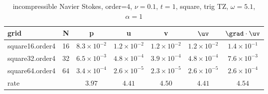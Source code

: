 \begin{table}[hbt]
\begin{center}
\begin{tabular}{|l|c|c|c|c|c|c|} \hline\hline 
grid  & N &  p &  u & v & $\uv$ & $\grad\cdot\uv$\\ \hline 
     square16.order4 &    16 &  $8.3\times10^{ -2}$  &  $1.2\times10^{ -2}$  &  $1.2\times10^{ -2}$  &  $1.2\times10^{ -2}$  &  $1.4\times10^{ -1}$   \\ \hline
     square32.order4 &    32 &  $6.5\times10^{ -3}$  &  $4.8\times10^{ -4}$  &  $3.9\times10^{ -4}$  &  $4.8\times10^{ -4}$  &  $7.6\times10^{ -3}$   \\ \hline
     square64.order4 &    64 &  $3.4\times10^{ -4}$  &  $2.6\times10^{ -5}$  &  $2.3\times10^{ -5}$  &  $2.6\times10^{ -5}$  &  $2.6\times10^{ -4}$   \\ \hline
    rate            &     &       $3.97$ &       $4.41$ &       $4.50$ &       $4.41$ &       $4.54$  \\ \hline\hline
\end{tabular}
\caption{incompressible Navier Stokes, order=$4$, $\nu=0.1$, $t=1$, square, trig TZ, $\omega=5.1$, $\alpha=1$}\label{table:ins.square}
\end{center}
\end{table}

